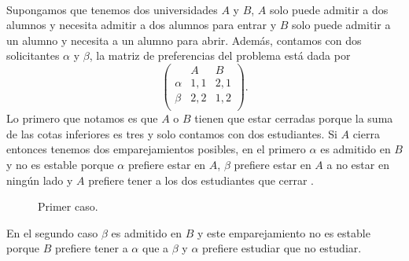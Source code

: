 \begin{eje}
\cite{Todo}\\
Supongamos que tenemos dos universidades $A$ y $B$, $A$ solo puede admitir a dos alumnos y necesita admitir a dos alumnos para entrar y $B$ solo puede admitir a un alumno y necesita a un alumno para abrir. Además, contamos con dos solicitantes $\alpha$ y $\beta$, la matriz de preferencias del problema está dada por 
$$\begin{pmatrix}
& A & B \\
\alpha & 1,1 & 2,1 \\
\beta & 2,2 & 1,2 \\ 
\end{pmatrix}.$$
Lo primero que notamos es que $A$ o $B$ tienen que estar cerradas porque la suma de las cotas inferiores es tres y solo contamos con dos estudiantes. Si $A$ cierra entonces tenemos dos emparejamientos posibles, en el primero $\alpha$ es admitido en $B$ y no es estable porque $\alpha$ prefiere estar en $A$, $\beta$ prefiere estar en $A$ a no estar en ningún lado y $A$ prefiere tener a los dos estudiantes que cerrar . 
\begin{figure}[H]\centering


\caption{Primer caso.}
\end{figure}
En el segundo caso $\beta$ es admitido en $B$ y este emparejamiento no es estable porque $B$ prefiere tener a $\alpha$ que a $\beta$ y $\alpha$ prefiere estudiar que no estudiar. 
\begin{figure}[H]\centering


\end{figure}
\end{eje}
